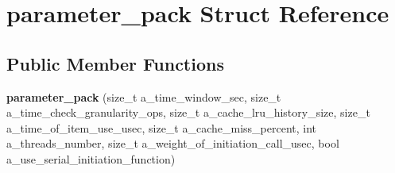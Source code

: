 \hypertarget{structparameter__pack}{}\section{parameter\+\_\+pack Struct Reference}
\label{structparameter__pack}
\subsection*{Public Member Functions}
\begin{DoxyCompactItemize}
\item 
\hypertarget{structparameter__pack_a9edddfbe8f7d8d69ca971a64c5746408}{}{\bfseries parameter\+\_\+pack} (size\+\_\+t a\+\_\+time\+\_\+window\+\_\+sec, size\+\_\+t a\+\_\+time\+\_\+check\+\_\+granularity\+\_\+ops, size\+\_\+t a\+\_\+cache\+\_\+lru\+\_\+history\+\_\+size, size\+\_\+t a\+\_\+time\+\_\+of\+\_\+item\+\_\+use\+\_\+usec, size\+\_\+t a\+\_\+cache\+\_\+miss\+\_\+percent, int a\+\_\+threads\+\_\+number, size\+\_\+t a\+\_\+weight\+\_\+of\+\_\+initiation\+\_\+call\+\_\+usec, bool a\+\_\+use\+\_\+serial\+\_\+initiation\+\_\+function)\label{structparameter__pack_a9edddfbe8f7d8d69ca971a64c5746408}

\end{DoxyCompactItemize}
